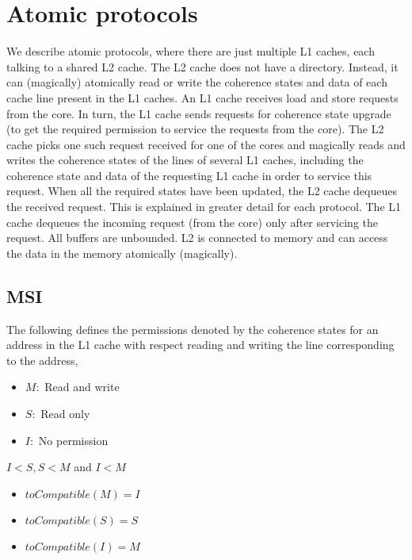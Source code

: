 \section{Atomic protocols}
\label{sec:atomic}

We describe atomic protocols, where there are just multiple L1 caches, each
talking to a shared L2 cache. The L2 cache does not have a directory. Instead,
it can (magically) atomically read or write the coherence states and data of
each cache line present in the L1 caches. An L1 cache receives load and store
requests from the core. In turn, the L1 cache sends requests for coherence state
upgrade (to get the required permission to service the requests from the core).
The L2 cache picks one such request received for one of the cores and magically
reads and writes the coherence states of the lines of several L1 caches,
including the coherence state and data of the requesting L1 cache in order to
service this request. When all the required states have been updated, the L2
cache dequeues the received request. This is explained in greater detail for
each protocol. The L1 cache dequeues the incoming request (from the core) only
after servicing the request. All buffers are unbounded. L2 is connected to
memory and can access the data in the memory atomically (magically).

\newcommand{\threeAngle}[4]{\text{$#1\langle#2,#3,#4\rangle$}}

\newcommand{\Req}[3]{\threeAngle{Req}{#1}{#2}{#3}}
\newcommand{\Resp}[3]{\threeAngle{Resp}{#1}{#2}{#3}}

\subsection{MSI}

The following defines the permissions denoted by the coherence states for an
address in the L1 cache with respect reading and writing the line corresponding
to the address,

\begin{itemize}
\item $M:$ Read and write
\item $S:$ Read only
\item $I:$ No permission
\end{itemize}

$I < S, S < M$ and $I < M$

\begin{itemize}
\item $toCompatible(M) = I$
\item $toCompatible(S) = S$
\item $toCompatible(I) = M$
\end{itemize}

